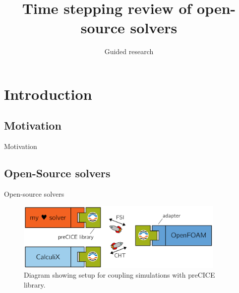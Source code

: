 \documentclass[
  english,            %
  aspectratio=43,    %
]{tumbeamer}
\title{Time stepping review of open-source solvers}
\subtitle{Guided research}
\author{\theAuthorName}
\date{
    \small

\textbf{Supervisor:} Prof. Dr. Hans-Joachim Bungartz \\
\textbf{Advisor:} M.Sc. Benjamin Rodenberg \\
}
\begin{document}
\maketitle

\section{Introduction}

\subsection{Motivation}
\begin{frame}{Motivation}
\end{frame}

\subsection{Open-Source solvers}
\begin{frame}{Open-source solvers}
\vspace*{\fill}
    \begin{figure}
        \centering
        \includegraphics[width=0.9\textwidth]{resources/preCICE_graphic.png}
        \caption{Diagram showing setup for coupling simulations with preCICE library.}
        \label{fig:open-source}
    \end{figure}
\end{frame}
\end{document}
